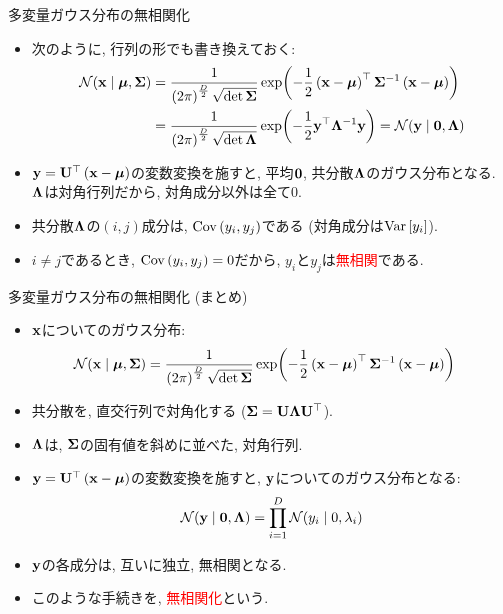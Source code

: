 \documentclass[dvipdfmx,notheorems,t]{beamer}
\begin{document}
\begin{frame}{多変量ガウス分布の無相関化}
\begin{itemize}
  \item 次のように, 行列の形でも書き換えておく:
  \begin{align*}
    \mathcal{N}(\vb{x} \mid \vb*{\mu}, \vb{\Sigma})
      &= \frac{1}{\left( 2\pi \right)^\frac{D}{2} \sqrt{\det \vb{\Sigma}}}
        \exp(-\frac{1}{2} \left( \vb{x} - \vb*{\mu} \right)^\top \vb{\Sigma}^{-1}
        \left( \vb{x} - \vb*{\mu} \right)) \\
      &= \frac{1}{\left( 2\pi \right)^\frac{D}{2} \sqrt{\det \vb{\Lambda}}}
        \exp(-\frac{1}{2} \vb{y}^\top \vb{\Lambda}^{-1} \vb{y})
      = \mathcal{N}(\vb{y} \mid \vb{0}, \vb{\Lambda})
  \end{align*}
  \item $\vb{y} = \vb{U}^\top \left( \vb{x} - \vb*{\mu} \right)$の変数変換を施すと,
  平均$\vb{0}$, 共分散$\vb{\Lambda}$のガウス分布となる.
  $\vb{\Lambda}$は対角行列だから, 対角成分以外は全て$0$.
  \item 共分散$\vb{\Lambda}$の$(i, j)$成分は, $\operatorname{Cov} \left( y_i, y_j \right)$である (対角成分は$\operatorname{Var} \left[ y_i \right]$).
  \item $i \neq j$であるとき, $\operatorname{Cov} \left( y_i, y_j \right) = 0$だから, $y_i$と$y_j$は\textcolor{red}{無相関}である.
\end{itemize}
\end{frame}

\begin{frame}{多変量ガウス分布の無相関化 (まとめ)}
\begin{itemize}
  \item $\vb{x}$についてのガウス分布:
  \begin{align*}
    \mathcal{N}(\vb{x} \mid \vb*{\mu}, \vb{\Sigma})
      &= \frac{1}{\left( 2\pi \right)^\frac{D}{2} \sqrt{\det \vb{\Sigma}}}
        \exp(-\frac{1}{2} \left( \vb{x} - \vb*{\mu} \right)^\top \vb{\Sigma}^{-1}
        \left( \vb{x} - \vb*{\mu} \right))
  \end{align*}
  \item 共分散を, 直交行列で対角化する ($\vb{\Sigma} = \vb{U} \vb{\Lambda} \vb{U}^\top$).
  \item $\vb{\Lambda}$は, $\vb{\Sigma}$の固有値を斜めに並べた, 対角行列.
  \item $\vb{y} = \vb{U}^\top \left( \vb{x} - \vb*{\mu} \right)$の変数変換を施すと, $\vb{y}$についてのガウス分布となる:
  \begin{align*}
    \mathcal{N}(\vb{y} \mid \vb{0}, \vb{\Lambda}) = \prod_{i = 1}^D \mathcal{N}(y_i \mid 0, \lambda_i)
  \end{align*}
  \item $\vb{y}$の各成分は, 互いに独立, 無相関となる.
  \item このような手続きを, \textcolor{red}{無相関化}という.
\end{itemize}
\end{frame}
\end{document}
